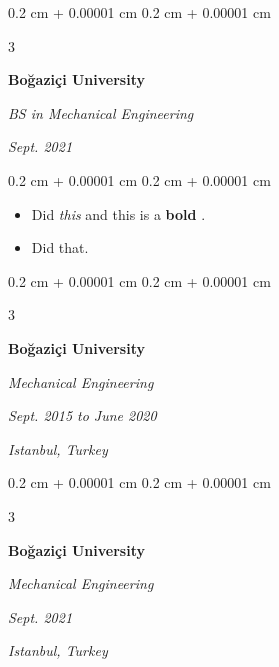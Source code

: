 \documentclass[10pt, letterpaper]{article}
\newenvironment{highlights}{
    \begin{itemize}[
        topsep=0.10 cm,
        parsep=0.10 cm,
        partopsep=0pt,
        itemsep=0pt,
        leftmargin=0.4 cm + 10pt + 0.6 cm
    ]
}{
    \end{itemize}
} %
\newenvironment{onecolentry}{
    \begin{adjustwidth}{
        0.2 cm + 0.00001 cm
    }{
        0.2 cm + 0.00001 cm
    }
}{
    \end{adjustwidth}
} %
\newenvironment{threecolentry}[3][]{
    \onecolentry
    \def\thirdColumn{#3}
    \setcolumnwidth{0.6 cm, \fill, 4.5 cm}
    \begin{paracol}{3}
    #2 \switchcolumn
}{
    \switchcolumn \raggedleft \thirdColumn
    \end{paracol}
    \endonecolentry
} %
\let\hrefWithoutArrow\href
\renewcommand{\href}[2]{\hrefWithoutArrow{#1}{\mbox{\ifthenelse{\equal{#2}{}}{ }{#2 }\raisebox{.15ex}{\footnotesize \faExternalLink*}}}}
\begin{document}
        \vspace{0.2 cm}

        \begin{threecolentry}{
            \vspace*{\fill}
            \textbullet
            \vspace*{3px}
            \vspace*{\fill}
        }{
        \textit{Sept. 2021}
            
        }
            \textbf{Boğaziçi University}

            \textit{BS in Mechanical Engineering}
        \end{threecolentry}

        \vspace{0.10 cm}
        \begin{onecolentry}
            \begin{highlights}
                \item Did \textit{this} and this is a \textbf{bold} \href{https://example.com}{link}.
                \item Did that.
            \end{highlights}
        \end{onecolentry}


        \vspace{0.2 cm}

        \begin{threecolentry}{
            \vspace*{\fill}
            \textbullet
            \vspace*{3px}
            \vspace*{\fill}
        }{
        \textit{Sept. 2015 to June 2020}
            
        \textit{Istanbul, Turkey}}
            \textbf{Boğaziçi University}

            \textit{Mechanical Engineering}
        \end{threecolentry}



        \vspace{0.2 cm}

        \begin{threecolentry}{
            \vspace*{\fill}
            \textbullet
            \vspace*{3px}
            \vspace*{\fill}
        }{
        \textit{Sept. 2021}
            
        \textit{Istanbul, Turkey}}
            \textbf{Boğaziçi University}

            \textit{Mechanical Engineering}
        \end{threecolentry}
\end{document}
